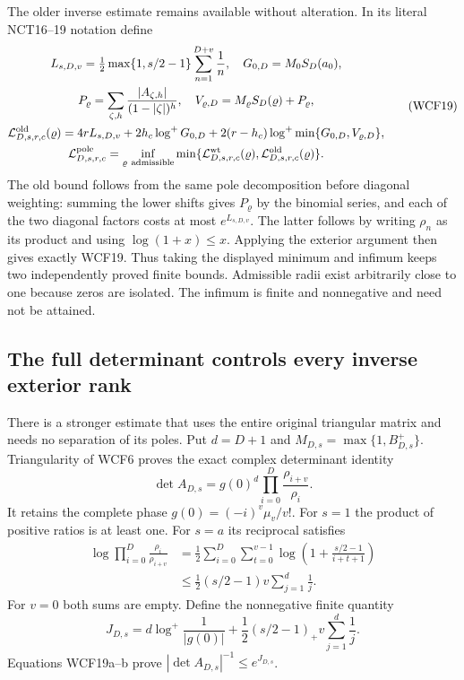 The older inverse estimate remains available without alteration. In its
literal NCT16--19 notation define
\[
\begin{gathered}
 L_{s,D,v}=\tfrac12\max\{1,s/2-1\}\sum_{n=1}^{D+v}\frac1n,
 \quad G_{0,D}=M_0S_D(a_0),\\
 P_\varrho=\sum_{\zeta,h}\frac{|A_{\zeta,h}|}{(1-|\zeta|)^h},
 \quad V_{\varrho,D}=M_\varrho S_D(\varrho)+P_\varrho,\\
 \mathcal L^{\rm old}_{D,s,r,c}(\varrho)
 =4rL_{s,D,v}+2h_c\log^+G_{0,D}
       +2(r-h_c)\log^+\min\{G_{0,D},V_{\varrho,D}\},\\
 \mathcal L^{\rm pole}_{D,s,r,c}=
  \inf_{\varrho\ {\rm admissible}}
  \min\{\mathcal L^{\rm wt}_{D,s,r,c}(\varrho),
        \mathcal L^{\rm old}_{D,s,r,c}(\varrho)\}.
\end{gathered}\tag{WCF19}
\]
The old bound follows from the same pole decomposition before diagonal
weighting: summing the lower shifts gives $P_\varrho$ by the binomial
series, and each of the two diagonal factors costs at most
$e^{L_{s,D,v}}$. The latter follows by writing $\rho_n$ as its
product and using $\log(1+x)\le x$. Applying the exterior argument
then gives exactly WCF19. Thus taking the displayed minimum and
infimum keeps two independently proved finite bounds. Admissible radii
exist arbitrarily close to one because zeros are isolated. The infimum
is finite and nonnegative and need not be attained.

\subsection{The full determinant controls every inverse exterior rank}

There is a stronger estimate that uses the entire original triangular
matrix and needs no separation of its poles. Put $d=D+1$ and
$M_{D,s}=\max\{1,B^+_{D,s}\}$. Triangularity of WCF6 proves the
exact complex determinant identity
\[
 \det A_{D,s}=g(0)^d\prod_{i=0}^{D}\frac{\rho_{i+v}}{\rho_i}.
 \tag{WCF19a}
\]
It retains the complete phase $g(0)=(-i)^v\mu_v/v!$. For $s=1$ the
product of positive ratios is at least one. For $s=a$ its reciprocal
satisfies
\[
 \begin{split}
 \log\prod_{i=0}^{D}\frac{\rho_i}{\rho_{i+v}}
 &=\frac12\sum_{i=0}^{D}\sum_{t=0}^{v-1}
           \log\left(1+\frac{s/2-1}{i+t+1}\right)\\
 &\le\frac12(s/2-1)v\sum_{j=1}^{d}\frac1j.
 \end{split}\tag{WCF19b}
\]
For $v=0$ both sums are empty. Define the nonnegative finite quantity
\[
 J_{D,s}=d\log^+\frac1{|g(0)|}
       +\frac12(s/2-1)_+v\sum_{j=1}^{d}\frac1j.
 \tag{WCF19c}
\]
Equations WCF19a--b prove $|\det A_{D,s}|^{-1}\le e^{J_{D,s}}$.

